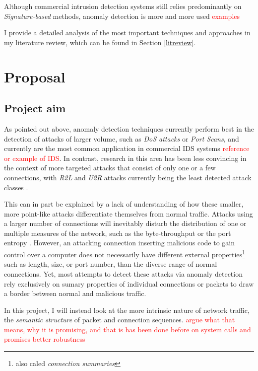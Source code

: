 \documentclass[a4paper,12pt,twoside]{report}
\begin{document}
Although commercial intrusion detection systems still relies predominantly on \textit{Signature-based} methods, anomaly detection is more and more used  \textcolor{red}{examples}


I provide a detailed analysis of the most important techniques and approaches in my literature review, which can be found in Section \ref{litreview}. 

\chapter{Proposal}

\section{Project aim}

As pointed out above, anomaly detection techniques currently perform best in the detection of attacks of larger volume, such as \textit{DoS attacks} or \textit{Port Scans}, and currently are the most common application in commercial IDS systems \textcolor{red}{reference or example of IDS}. In contrast, research in this area has been less convincing in the context of more targeted attacks that consist of only one or a few connections, with \textit{R2L} and \textit{U2R} attacks currently being the least detected attack classes \cite{nisioti2018intrusion}. 

This can in part be explained by a lack of understanding of how these smaller, more point-like attacks differentiate themselves from normal traffic. Attacks using a larger number of connections will inevitably disturb the  distribution of one or multiple measures of the network, such as the byte-throughput or the port entropy \cite{lakhina2005mining}. However, an attacking connection inserting malicious code to gain control over a computer does not necessarily have different external properties\footnote{also caled \textit{connection summaries}} such as length, size, or port number, than the diverse range of normal connections. Yet, most attempts to detect these attacks via anomaly detection rely exclusively on sumary properties of individual connections or packets to draw a border between normal and malicious traffic.

In this project, I will instead look at the more intrinsic nature of network traffic, the \textit{semantic structure} of packet and connection sequences. \textcolor{red}{argue what that means, why it is promising, and that is has been done before on system calls and promises better robustness}
\end{document}
